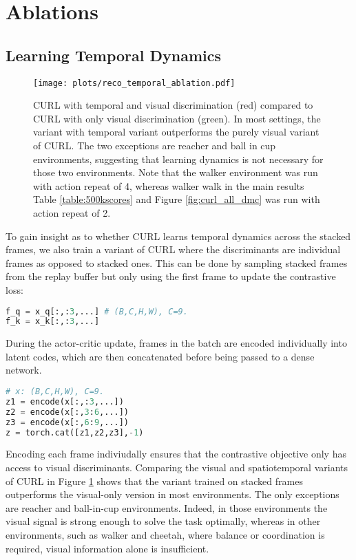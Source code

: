 \documentclass{article}
\begin{document}
\section{Ablations}\label{appendix:ablation}

\subsection{Learning Temporal Dynamics}
\begin{figure}[t]
 \begin{center}
   \centerline{\texttt{[image: plots/reco\_temporal\_ablation.pdf]}}
   \caption{CURL with temporal and visual discrimination (red) compared to CURL with only visual discrimination (green). In most settings, the variant with temporal variant outperforms the purely visual variant of CURL. The two exceptions are reacher and ball in cup environments, suggesting that learning dynamics is not necessary for those two environments. Note that the walker environment was run with action repeat of 4, whereas walker walk in the main results Table \ref{table:500kscores} and Figure \ref{fig:curl_all_dmc} was run with action repeat of 2. }
   \vspace{-6mm}
   \label{fig:curl_temporal_ablation}
 \end{center}
 \end{figure}
 
 To gain insight as to whether CURL learns temporal dynamics across the stacked frames, we also train a variant of CURL where the discriminants are individual frames as opposed to stacked ones. This can be done by sampling stacked frames from the replay buffer but only using the first frame to update the contrastive loss:

\begin{lstlisting}[language=python]
f_q = x_q[:,:3,...] # (B,C,H,W), C=9.
f_k = x_k[:,:3,...]
\end{lstlisting}


During the actor-critic update, frames in the batch are encoded individually into latent codes, which are then concatenated before being passed to a dense network.

\begin{lstlisting}[language=python]
# x: (B,C,H,W), C=9.
z1 = encode(x[:,:3,...])
z2 = encode(x[:,3:6,...])
z3 = encode(x[:,6:9,...])
z = torch.cat([z1,z2,z3],-1)
\end{lstlisting}


Encoding each frame indiviudally ensures that the contrastive objective only has access to visual discriminants. Comparing the visual and spatiotemporal variants of CURL in Figure \ref{fig:curl_temporal_ablation} shows that the variant trained on stacked frames outperforms the visual-only version in most environments. The only exceptions are reacher and ball-in-cup environments. Indeed, in those environments the visual signal is strong enough to solve the task optimally, whereas in other environments, such as walker and cheetah, where balance or coordination is required, visual information alone is insufficient.
\end{document}
